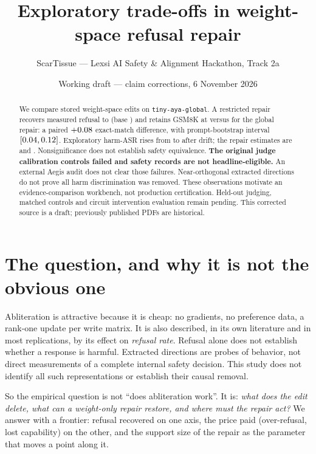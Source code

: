 \documentclass[10pt,a4paper]{article}
\title{\vspace{-1.4cm}\bfseries Exploratory trade-offs in weight-space refusal repair}
\author{ScarTissue --- Lexsi AI Safety \& Alignment Hackathon, Track 2a}
\date{Working draft --- claim corrections, 6 November 2026}
\newcommand{\code}[1]{\texttt{\small #1}}
\begin{document}
\maketitle
\vspace{-0.6cm}

\begin{abstract}
\noindent
We compare stored weight-space edits on \code{tiny-aya-global}. A restricted repair recovers measured
refusal to \HarmRef{} (base \BaseRef{}) and retains GSM8K at \HarmGsm{} versus \GlobGsm{} for the
global repair: a paired $+0.08$ exact-match difference, with prompt-bootstrap interval
$[0.04,0.12]$. Exploratory harm-ASR rises from \BaseAsr{} to \DriftAsr{} after drift; the repair
estimates are \HarmAsr{} and \GlobAsr{}. Nonsignificance does not establish safety equivalence.
\textbf{The original judge calibration controls failed and safety records are not headline-eligible.}
An external Aegis audit does not clear those failures. Near-orthogonal extracted directions do not
prove all harm discrimination was removed. These observations motivate an evidence-comparison
workbench, not production certification. Held-out judging, matched controls and circuit intervention
evaluation remain pending. This corrected source is a draft; previously published PDFs are historical.
\end{abstract}

\vspace{-0.2cm}
\section{The question, and why it is not the obvious one}

Abliteration is attractive because it is cheap: no gradients, no preference data, a rank-one update
per write matrix. It is also described, in its own literature and in most replications, by its effect
on \emph{refusal rate}. Refusal alone does not establish whether a response is harmful. Extracted directions are probes of
behavior, not direct measurements of a complete internal safety decision. This study does not identify
all such representations or establish their causal removal.

So the empirical question is not ``does abliteration work''. It is:
\emph{what does the edit delete, what can a weight-only repair restore, and where must the repair act?}
We answer with a frontier: refusal recovered on one axis, the price paid (over-refusal, lost
capability) on the other, and the support size of the repair as the parameter that moves a point
along it.
\end{document}
